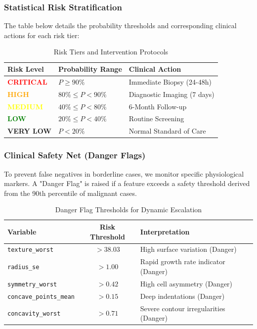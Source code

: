 \subsubsection{Statistical Risk Stratification}
The table below details the probability thresholds and corresponding clinical actions for each risk tier:

\begin{table}[h]
\centering
\begin{tabular}{|l|l|l|}
\hline
\textbf{Risk Level} & \textbf{Probability Range} & \textbf{Clinical Action} \\ \hline
\textbf{\textcolor{red}{CRITICAL}} & $P \ge 90\%$ & Immediate Biopsy (24-48h) \\ \hline
\textbf{\textcolor{orange}{HIGH}} & $80\% \le P < 90\%$ & Diagnostic Imaging (7 days) \\ \hline
\textbf{\textcolor{yellow}{MEDIUM}} & $40\% \le P < 80\%$ & 6-Month Follow-up \\ \hline
\textbf{\textcolor{green}{LOW}} & $20\% \le P < 40\%$ & Routine Screening \\ \hline
\textbf{VERY LOW} & $P < 20\%$ & Normal Standard of Care \\ \hline
\end{tabular}
\caption{Risk Tiers and Intervention Protocols}
\label{tab:risk_tiers}
\end{table}

\subsubsection{Clinical Safety Net (Danger Flags)}
To prevent false negatives in borderline cases, we monitor specific physiological markers. A "Danger Flag" is raised if a feature exceeds a safety threshold derived from the 90th percentile of malignant cases.

\begin{table}[h]
\centering
\begin{tabular}{|l|c|l|}
\hline
\textbf{Variable} & \textbf{Risk Threshold} & \textbf{Interpretation} \\ \hline
\texttt{texture\_worst} & $> 38.03$ & High surface variation (Danger) \\ \hline
\texttt{radius\_se} & $> 1.00$ & Rapid growth rate indicator (Danger) \\ \hline
\texttt{symmetry\_worst} & $> 0.42$ & High cell asymmetry (Danger) \\ \hline
\texttt{concave\_points\_mean} & $> 0.15$ & Deep indentations (Danger) \\ \hline
\texttt{concavity\_worst} & $> 0.71$ & Severe contour irregularities (Danger) \\ \hline
\end{tabular}
\caption{Danger Flag Thresholds for Dynamic Escalation}
\label{tab:danger_flags}
\end{table}

